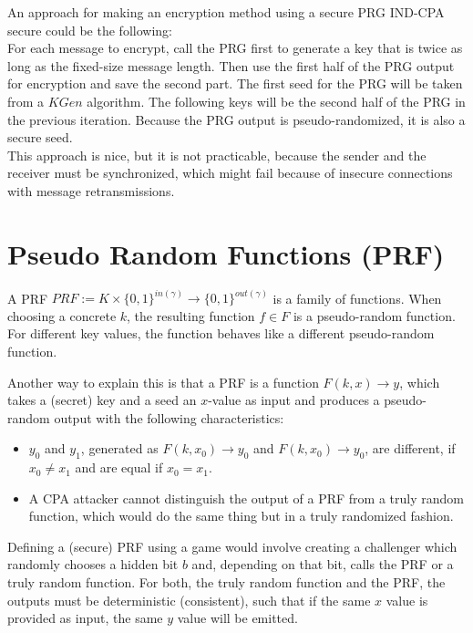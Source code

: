 An approach for making an encryption method using a secure PRG IND-CPA secure could be the following:\\
For each message to encrypt, call the PRG first to generate a key that is twice as long as the fixed-size message length. Then use the first half of the PRG output for encryption and save the second part. The first seed for the PRG will be taken from a $KGen$ algorithm. The following keys will be the second half of the PRG in the previous iteration. Because the PRG output is pseudo-randomized, it is also a secure seed.\\
This approach is nice, but it is not practicable, because the sender and the receiver must be synchronized, which might fail because of insecure connections with message retransmissions.

\section{Pseudo Random Functions (PRF)}

A PRF $PRF :=  K \times \{0,1\}^{in(\gamma)} \rightarrow \{0,1\}^{out(\gamma)}$ is a family of functions. When choosing a concrete $k$, the resulting function $f \in F$ is a pseudo-random function. For different key values, the function behaves like a different pseudo-random function.

Another way to explain this is that a PRF is a function $F(k,x) \rightarrow y$, which takes a (secret) key and a seed an $x$-value as input and produces a pseudo-random output with the following characteristics:

\begin{itemize}
    \item $y_0$ and $y_1$, generated as $F(k,x_0) \rightarrow y_0$ and $F(k,x_0) \rightarrow y_0$, are different, if $x_0 \neq x_1$ and are equal if $x_0 = x_1$.
    \item A CPA attacker cannot distinguish the output of a PRF from a truly random function, which would do the same thing but in a truly randomized fashion.
\end{itemize}

Defining a (secure) PRF using a game would involve creating a challenger which randomly chooses a hidden bit $b$ and, depending on that bit, calls the PRF or a truly random function. For both, the truly random function and the PRF, the outputs must be deterministic (consistent), such that if the same $x$ value is provided as input, the same $y$ value will be emitted.


